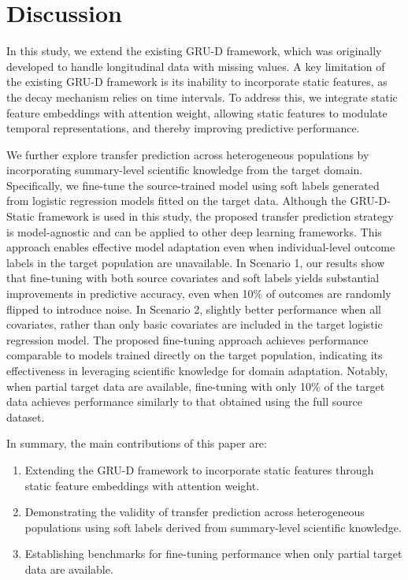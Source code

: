 \documentclass[fleqn,10pt]{wlscirep}
\begin{document}
\section*{Discussion}

In this study, we extend the existing GRU-D framework, which was originally developed to handle longitudinal data with missing values. A key limitation of the existing GRU-D framework is its inability to incorporate static features, as the decay mechanism relies on time intervals. To address this, we integrate static feature embeddings with attention weight, allowing static features to modulate temporal representations, and thereby improving predictive performance.

We further explore transfer prediction across heterogeneous populations by incorporating summary-level scientific knowledge from the target domain. Specifically, we fine-tune the source-trained model using soft labels generated from logistic regression models fitted on the target data. Although the GRU-D-Static framework is used in this study, the proposed transfer prediction strategy is model-agnostic and can be applied to other deep learning frameworks. This approach enables effective model adaptation even when individual-level outcome labels in the target population are unavailable. In Scenario 1, our results show that fine-tuning with both source covariates and soft labels yields substantial improvements in predictive accuracy, even when 10\% of outcomes are randomly flipped to introduce noise. In Scenario 2, slightly better performance when all covariates, rather than only basic covariates are included in the target logistic regression model. The proposed fine-tuning approach achieves performance comparable to models trained directly on the target population, indicating its effectiveness in leveraging scientific knowledge for domain adaptation. Notably, when partial target data are available, fine-tuning with only 10\% of the target data achieves performance similarly to that obtained using the full source dataset.

In summary, the main contributions of this paper are:
\begin{enumerate}
    \item Extending the GRU-D framework to incorporate static features through static feature embeddings with attention weight.
    \item Demonstrating the validity of transfer prediction across heterogeneous populations using soft labels derived from summary-level scientific knowledge.
    \item Establishing benchmarks for fine-tuning performance when only partial target data are available.
\end{enumerate}
\end{document}
